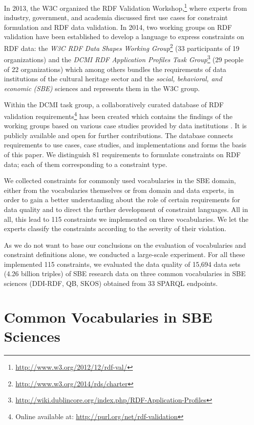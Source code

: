 \documentclass{llncs}
\begin{document}
In 2013, the W3C organized the RDF Validation Workshop,\footnote{\url{http://www.w3.org/2012/12/rdf-val/}} 
where experts from industry, government, and academia discussed first use cases for constraint formulation and RDF data validation.
In 2014, two working groups on RDF validation have been established to develop a language to express constraints on RDF data: 
the \emph{W3C RDF Data Shapes Working Group}\footnote{\url{http://www.w3.org/2014/rds/charter}} (33 participants of 19 organizations) and the \emph{DCMI RDF Application Profiles Task Group}\footnote{\url{http://wiki.dublincore.org/index.php/RDF-Application-Profiles}} (29 people of 22 organizations) which among others bundles the requirements of data institutions of the cultural heritage sector and the \emph{social, behavioral, and economic (SBE)} sciences and represents them in the W3C group. 

Within the DCMI task group, a collaboratively curated database of RDF validation requirements\footnote{Online available at: \url{http://purl.org/net/rdf-validation}} has been created which contains the findings of the working groups based on various case studies provided by data institutions \cite{BoschEckert2014}. It is publicly available and open for further contributions.
The database connects requirements to use cases, case studies, and implementations and forms the basis of this paper. 
We distinguish 81 requirements to formulate constraints on RDF data; 
each of them corresponding to a constraint type.

We collected constraints for commonly used vocabularies in the SBE domain, either from the vocabularies themselves or from domain and data experts, in order to gain a better understanding about the role of certain requirements for data quality and to direct the further development of constraint languages. All in all, this lead to 115 constraints we implemented on three vocabularies.
We let the experts classify the constraints according to the severity of their violation. 

As we do not want to base our conclusions on the evaluation of vocabularies and constraint definitions alone, we conducted a large-scale experiment.
For all these implemented 115 constraints, we evaluated the data quality of 15,694 data sets (4.26 billion triples) of SBE research data on three common vocabularies in SBE sciences (DDI-RDF, QB, SKOS) obtained from 33 SPARQL endpoints.

\section{Common Vocabularies in SBE Sciences}
\label{sbe-vocabularies}
\end{document}
